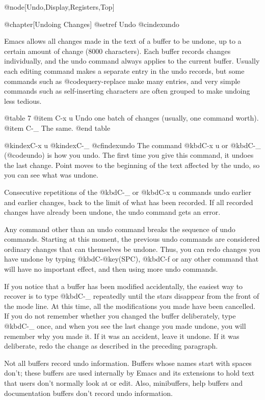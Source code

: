 {{{{{{@node[Undo,Display,Registers,Top]

@chapter[Undoing Changes]
@setref Undo
@cindex{undo}

  Emacs allows all changes made in the text of a buffer to be undone,
up to a certain amount of change (8000 characters).  Each buffer records
changes individually, and the undo command always applies to the
current buffer.  Usually each editing command makes a separate entry
in the undo records, but some commands such as @code{query-replace}
make many entries, and very simple commands such as self-inserting
characters are often grouped to make undoing less tedious.

@table 7
@item C-x u
Undo one batch of changes (usually, one command worth).
@item C-_
The same.
@end table

@kindex{C-x u}
@kindex{C-_}
@cfindex{undo}
  The command @kbd{C-x u} or @kbd{C-_} (@code{undo}) is how you undo.
The first time you give this command, it undoes the last change.
Point moves to the beginning of the text affected by the undo,
so you can see what was undone.

  Consecutive repetitions of the @kbd{C-_} or @kbd{C-x u} commands undo
earlier and earlier changes, back to the limit of what has been recorded.
If all recorded changes have already been undone, the undo command gets an
error.

  Any command other than an undo command breaks the sequence of undo
commands.  Starting at this moment, the previous undo commands are considered
ordinary changes that can themselves be undone.  Thus, you can redo changes
you have undone by typing @kbd{C-@key(SPC)}, @kbd{C-f} or any other
command that will have no important effect, and then using more undo commands.

  If you notice that a buffer has been modified accidentally, the easiest
way to recover is to type @kbd{C-_} repeatedly until the stars disappear
from the front of the mode line.  At this time, all the modifications you
made have been cancelled.  If you do not remember whether you changed the
buffer deliberately, type @kbd{C-_} once, and when you see the last change
you made undone, you will remember why you made it.  If it was an accident,
leave it undone.  If it was deliberate, redo the change as described in
the preceding paragraph.

  Not all buffers record undo information.  Buffers whose names start with
spaces don't; these buffers are used internally by Emacs and its extensions
to hold text that users don't normally look at or edit.  Also, minibuffers,
help buffers and documentation buffers don't record undo information.

}}}}}}
